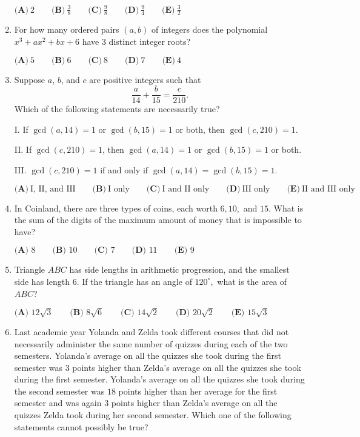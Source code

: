 \documentclass{article}
\begin{document}
\begin{enumerate}[label=\arabic*., itemsep=0.5em]
$\textbf{(A)}~2\qquad\textbf{(B)}~\frac{3}{8}\qquad\textbf{(C)}~\frac{9}{8}\qquad\textbf{(D)}~\frac{9}{4}\qquad\textbf{(E)}~\frac{3}{2}$\par \vspace{0.5em}\item For how many ordered pairs $(a,b)$ of integers does the polynomial $x^3+ax^2+bx+6$ have $3$ distinct integer roots?

$\textbf{(A)}\ 5 \qquad\textbf{(B)}\ 6 \qquad\textbf{(C)}\ 8 \qquad\textbf{(D)}\ 7 \qquad\textbf{(E)}\ 4$\par \vspace{0.5em}\item Suppose $a$, $b$, and $c$ are positive integers such that
\begin{equation*}
\frac{a}{14}+\frac{b}{15}=\frac{c}{210}.
\end{equation*}
Which of the following statements are necessarily true?

I. If $\gcd(a,14)=1$ or $\gcd(b,15)=1$ or both, then $\gcd(c,210)=1$.

II. If $\gcd(c,210)=1$, then $\gcd(a,14)=1$ or $\gcd(b,15)=1$ or both.

III. $\gcd(c,210)=1$ if and only if $\gcd(a,14)=\gcd(b,15)=1$.

$\textbf{(A)}~\text{I, II, and III}\qquad\textbf{(B)}~\text{I only}\qquad\textbf{(C)}~\text{I and II only}\qquad\textbf{(D)}~\text{III only}\qquad\textbf{(E)}~\text{II and III only}$\par \vspace{0.5em}\item In Coinland, there are three types of coins, each worth $6, 10,$ and $15.$ What is the sum of the digits of the maximum amount of money that is impossible to have?

$\textbf{(A) }8\qquad\textbf{(B) }10\qquad\textbf{(C) }7\qquad\textbf{(D) }11\qquad\textbf{(E) }9$\par \vspace{0.5em}\item Triangle $ABC$ has side lengths in arithmetic progression, and the smallest side has length $6$. If the triangle has an angle of $120^\circ,$ what is the area of $ABC$?

$\textbf{(A) }12\sqrt{3}\qquad\textbf{(B) }8\sqrt{6}\qquad\textbf{(C) }14\sqrt{2}\qquad\textbf{(D) }20\sqrt{2}\qquad\textbf{(E) }15\sqrt{3}$\par \vspace{0.5em}\item Last academic year Yolanda and Zelda took different courses that did not necessarily administer the same number of quizzes during each of the two semesters. Yolanda's average on all the quizzes she took during the first semester was $3$ points higher than Zelda's average on all the quizzes she took during the first semester. Yolanda's average on all the quizzes she took during the second semester was $18$ points higher than her average for the first semester and was again $3$ points higher than Zelda's average on all the quizzes Zelda took during her second semester. Which one of the following statements cannot possibly be true?


\end{enumerate}
\end{document}
